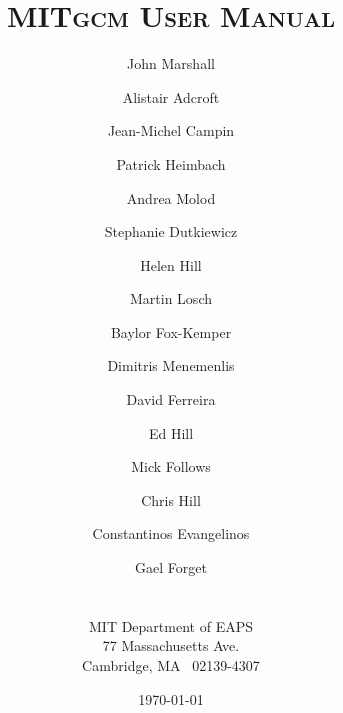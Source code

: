 \documentclass[10pt]{book}
\begin{document}

\title{ \textsc{MITgcm User Manual} }

\author{
  John Marshall \and Alistair Adcroft \and Jean-Michel Campin 
  \and Patrick Heimbach \and Andrea Molod \and Stephanie Dutkiewicz
  \and Helen Hill \and Martin Losch \and Baylor Fox-Kemper
  \and Dimitris Menemenlis \and David Ferreira \and Ed Hill 
  \and Mick Follows \and Chris Hill \and Constantinos Evangelinos
  \and Gael Forget
  \\
  \\
  \\
  MIT Department of EAPS  \\
  77 Massachusetts Ave. \\
  Cambridge, MA \ 02139-4307
}

\date{\today}

\maketitle

\tableofcontents

























\end{document}
